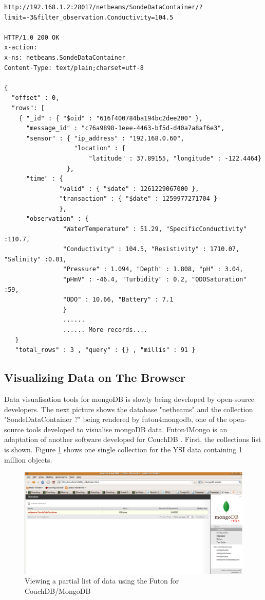 \lstset{label=cmd:mongo-rest-request,caption=REST HTTP Interface Example}
\begin{lstlisting}
http://192.168.1.2:28017/netbeams/SondeDataContainer/?limit=-3&filter_observation.Conductivity=104.5

HTTP/1.0 200 OK
x-action:
x-ns: netbeams.SondeDataContainer
Content-Type: text/plain;charset=utf-8

{
  "offset" : 0,
  "rows": [
    { "_id" : { "$oid" : "616f400784ba194bc2dee200" }, 
      "message_id" : "c76a9898-1eee-4463-bf5d-d40a7a8af6e3", 
      "sensor" : { "ip_address" : "192.168.0.60", 
                   "location" : {
                       "latitude" : 37.89155, "longitude" : -122.4464} 
                 }, 
      "time" : { 
               "valid" : { "$date" : 1261229067000 },
               "transaction" : { "$date" : 1259977271704 } 
               },
      "observation" : { 
                "WaterTemperature" : 51.29, "SpecificConductivity" :110.7,
                "Conductivity" : 104.5, "Resistivity" : 1710.07, "Salinity" :0.01, 
                "Pressure" : 1.094, "Depth" : 1.808, "pH" : 3.04,
                "pHmV" : -46.4, "Turbidity" : 0.2, "ODOSaturation" :59, 
                "ODO" : 10.66, "Battery" : 7.1 
                } 
                ......
                ...... More records....
   } 
   "total_rows" : 3 , "query" : {} , "millis" : 91 }
\end{lstlisting}

\subsection{Visualizing Data on The Browser}

Data visualisation tools for mongoDB is slowly being developed by open-source
developers. The next picture shows the database "netbeams" and the collection
"SondeDataContainer  ?" being rendered by futon4mongodb, one of the
open-source tools developed to visualise mongoDB data. Futon4Mongo is an
adaptation of another software developed for CouchDB \cite{couchdb}. First, the
collections list is shown. Figure
\ref{fig:view-collections-instance-browser-futondb} shows one single
collection for the YSI data containing 1 million objects.

\begin{figure}[h]
  \centering
  \includegraphics[scale=0.5]{../diagrams/view-collections-instance-browser-futondb}
  \caption{Viewing a partial list of data using the Futon for CouchDB/MongoDB}
  \label{fig:view-collections-instance-browser-futondb}
\end{figure}

